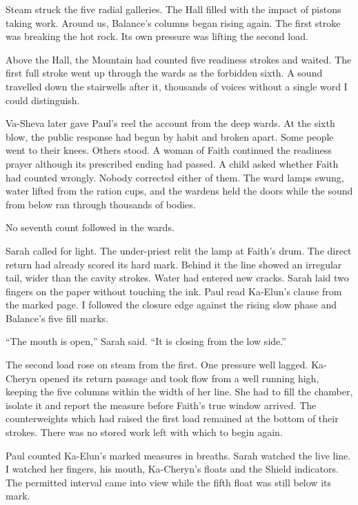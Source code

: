 Steam struck the five radial galleries. The Hall filled with the impact of pistons taking work. Around us, Balance's columns began rising again. The first stroke was breaking the hot rock. Its own pressure was lifting the second load.\par

Above the Hall, the Mountain had counted five readiness strokes and waited. The first full stroke went up through the wards as the forbidden sixth. A sound travelled down the stairwells after it, thousands of voices without a single word I could distinguish.\par

Va-Sheva later gave Paul's reel the account from the deep wards. At the sixth blow, the public response had begun by habit and broken apart. Some people went to their knees. Others stood. A woman of Faith continued the readiness prayer although its prescribed ending had passed. A child asked whether Faith had counted wrongly. Nobody corrected either of them. The ward lamps swung, water lifted from the ration cups, and the wardens held the doors while the sound from below ran through thousands of bodies.\par

No seventh count followed in the wards.\par

Sarah called for light. The under-priest relit the lamp at Faith's drum. The direct return had already scored its hard mark. Behind it the line showed an irregular tail, wider than the cavity strokes. Water had entered new cracks. Sarah laid two fingers on the paper without touching the ink. Paul read Ka-Elun's clause from the marked page. I followed the closure edge against the rising slow phase and Balance's five fill marks.\par

``The mouth is open,'' Sarah said. ``It is closing from the low side.''\par

The second load rose on steam from the first. One pressure well lagged. Ka-Cheryn opened its return passage and took flow from a well running high, keeping the five columns within the width of her line. She had to fill the chamber, isolate it and report the measure before Faith's true window arrived. The counterweights which had raised the first load remained at the bottom of their strokes. There was no stored work left with which to begin again.\par

Paul counted Ka-Elun's marked measures in breaths. Sarah watched the live line. I watched her fingers, his mouth, Ka-Cheryn's floats and the Shield indicators. The permitted interval came into view while the fifth float was still below its mark.\par

